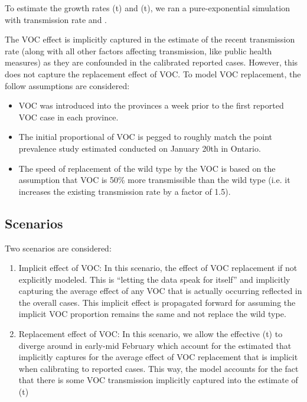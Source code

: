\documentclass[12pt]{article}\usepackage[]{graphicx}\usepackage[]{color}
\begin{document}
To estimate the growth rates \littlerwt(t) and \littlervoc(t), we ran a pure-exponential simulation with transmission rate \Bwt and \Bvoc.

The VOC effect is implicitly captured in the estimate of the recent transmission rate (along with all other factors affecting transmission, like public health measures) as they are confounded in the calibrated reported cases. 
However, this does not capture the replacement effect of VOC.
To model VOC replacement, the follow assumptions are considered:

\begin{itemize}
\item{VOC was introduced into the provinces a week prior to the first reported VOC case in each province.}
\item{The initial proportional of VOC is pegged to roughly match the point prevalence study estimated conducted on January 20th in Ontario.}
\item{The speed of replacement of the wild type by the VOC is based on the assumption that VOC is 50\% more transmissible than the wild type (i.e. it increases the existing transmission rate by a factor of 1.5).}
\end{itemize}

\subsection*{Scenarios}

Two scenarios are considered:

\begin{enumerate}
\item{Implicit effect of VOC: In this scenario, the effect of VOC replacement if not explicitly modeled. This is ``letting the data speak for itself'' and implicitly capturing the average effect of any VOC that is actually occurring reflected in the overall cases. This implicit effect is propagated forward for assuming the implicit VOC proportion remains the same and not replace the wild type.}
\item{Replacement effect of VOC: In this scenario, we allow the effective \B(t) to diverge around in early-mid February which account for the estimated \B that implicitly captures for the average effect of VOC replacement that is implicit when calibrating to reported cases. This way, the model accounts for the fact that there is some VOC transmission implicitly captured into the estimate of \B(t)}
\end{enumerate}
\end{document}

